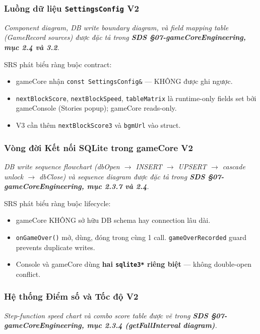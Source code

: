 \documentclass[12pt,a4paper]{article}
\begin{document}
\subsubsection{Luồng dữ liệu \texttt{SettingsConfig} V2}
\textit{Component diagram, DB write boundary diagram, và field mapping table
(GameRecord sources) được đặc tả trong
\textbf{SDS §07-gameCoreEngineering, mục 2.4 và 3.2}.}

SRS phát biểu ràng buộc contract:
\begin{itemize}[nosep]
  \item gameCore nhận \texttt{const SettingsConfig\&} --- KHÔNG được ghi ngược.
  \item \texttt{nextBlockScore}, \texttt{nextBlockSpeed}, \texttt{tableMatrix}
        là runtime-only fields set bởi gameConsole (Stories popup);
        gameCore reads-only.
  \item V3 cần thêm \texttt{nextBlockScore3} và \texttt{bgmUrl} vào struct.
\end{itemize}

\subsubsection{Vòng đời Kết nối SQLite trong gameCore V2}
\textit{DB write sequence flowchart (dbOpen $\rightarrow$ INSERT $\rightarrow$
UPSERT $\rightarrow$ cascade unlock $\rightarrow$ dbClose) và sequence diagram
được đặc tả trong \textbf{SDS §07-gameCoreEngineering, mục 2.3.7 và 2.4}.}

SRS phát biểu ràng buộc lifecycle:
\begin{itemize}[nosep]
  \item gameCore KHÔNG sở hữu DB schema hay connection lâu dài.
  \item \texttt{onGameOver()} mở, dùng, đóng trong cùng 1 call.
        \texttt{gameOverRecorded} guard prevents duplicate writes.
  \item Console và gameCore dùng \textbf{hai \texttt{sqlite3*} riêng biệt}
        --- không double-open conflict.
\end{itemize}

\subsubsection{Hệ thống Điểm số và Tốc độ V2}
\textit{Step-function speed chart và combo score table được vẽ trong
\textbf{SDS §07-gameCoreEngineering, mục 2.3.4 (getFallInterval diagram)}.}
\end{document}

